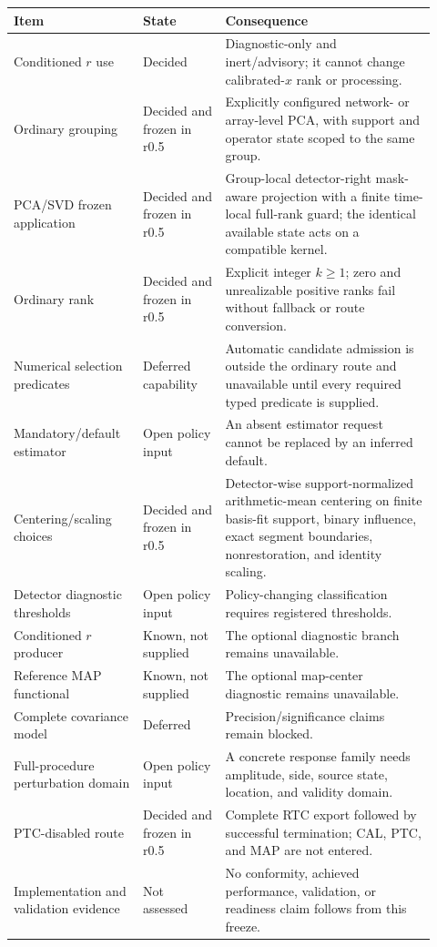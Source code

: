\documentclass[11pt]{article}
\begin{document}
\begingroup
\small
\begin{longtable}{>{\raggedright\arraybackslash}p{0.28\linewidth}
                  >{\raggedright\arraybackslash}p{0.18\linewidth}
                  >{\raggedright\arraybackslash}p{0.46\linewidth}}
\toprule
Item & State & Consequence \\
\midrule
\endhead
Conditioned $r$ use & Decided & Diagnostic-only and inert/advisory; it cannot change calibrated-$x$ rank or processing.\\
Ordinary grouping & Decided and frozen in r0.5 & Explicitly configured network- or array-level PCA, with support and operator state scoped to the same group.\\
PCA/SVD frozen application & Decided and frozen in r0.5 & Group-local detector-right mask-aware projection with a finite time-local full-rank guard; the identical available state acts on a compatible kernel.\\
Ordinary rank & Decided and frozen in r0.5 & Explicit integer $k\ge1$; zero and unrealizable positive ranks fail without fallback or route conversion.\\
Numerical selection predicates & Deferred capability & Automatic candidate admission is outside the ordinary route and unavailable until every required typed predicate is supplied.\\
Mandatory/default estimator & Open policy input & An absent estimator request cannot be replaced by an inferred default.\\
Centering/scaling choices & Decided and frozen in r0.5 & Detector-wise support-normalized arithmetic-mean centering on finite basis-fit support, binary influence, exact segment boundaries, nonrestoration, and identity scaling.\\
Detector diagnostic thresholds & Open policy input & Policy-changing classification requires registered thresholds.\\
Conditioned $r$ producer & Known, not supplied & The optional diagnostic branch remains unavailable.\\
Reference MAP functional & Known, not supplied & The optional map-center diagnostic remains unavailable.\\
Complete covariance model & Deferred & Precision/significance claims remain blocked.\\
Full-procedure perturbation domain & Open policy input & A concrete response family needs amplitude, side, source state, location, and validity domain.\\
PTC-disabled route & Decided and frozen in r0.5 & Complete RTC export followed by successful termination; CAL, PTC, and MAP are not entered.\\
Implementation and validation evidence & Not assessed & No conformity, achieved performance, validation, or readiness claim follows from this freeze.\\
\bottomrule
\end{longtable}
\endgroup
\end{document}
